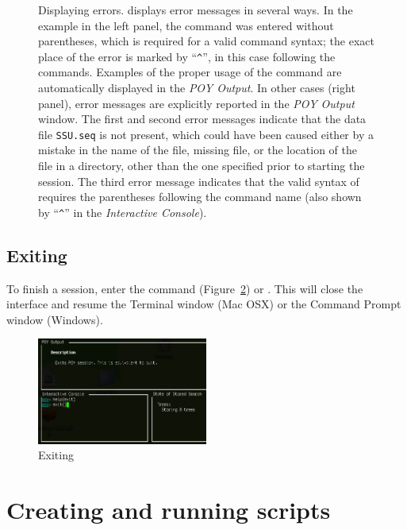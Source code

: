 {\begin{figure}
\caption{Displaying errors. \poy displays error messages in several ways. In the example in the left panel, the command  was entered without parentheses, which is required for a  valid \poy command syntax; the exact place of the error is marked by ``\texttt{\^}'', in this case  following the  commands. Examples of the proper usage of the command are automatically displayed in the \emph{POY Output}. In other cases (right panel), error messages are explicitly reported in the \emph{POY Output} window. The first and second error messages indicate that the data file \texttt{SSU.seq} is not present, which could have been caused either by a mistake in the name of the file, missing file, or the location of the file in a directory, other than the one specified prior to starting the \poy session. The third error message indicates that the valid syntax of  requires the parentheses following the command name (also shown by ``\texttt{\^}'' in  the \emph{Interactive Console}).}
\label{fig:errors}
\end{figure}

\subsection{Exiting}
To finish a \poy session, enter the command  (Figure~\ref{fig:exithelp}) or . This will close the \poy interface and resume the Terminal window (Mac OSX) or the Command Prompt window (Windows).

\begin{figure}[]
    \begin{center}
        \includegraphics[width=0.5\textwidth]{doc/figures/exithelp.jpg}
    \end{center}
    \caption{Exiting \poy}
    \label{fig:exithelp}
\end{figure}

\section{Creating and running \poy scripts}

}
